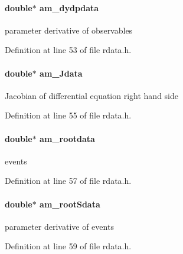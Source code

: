 \paragraph[{am\+\_\+dydpdata}]{\setlength{\rightskip}{0pt plus 5cm}double$\ast$ am\+\_\+dydpdata}\label{struct_return_data_a57a7eb2085d8ed5bb6c62331a2aa3af5}
parameter derivative of observables 

Definition at line 53 of file rdata.\+h.

\hypertarget{struct_return_data_a82d71415ca06c969ebd22a02e4789b1d}{}
\paragraph[{am\+\_\+\+Jdata}]{\setlength{\rightskip}{0pt plus 5cm}double$\ast$ am\+\_\+\+Jdata}\label{struct_return_data_a82d71415ca06c969ebd22a02e4789b1d}
Jacobian of differential equation right hand side 

Definition at line 55 of file rdata.\+h.

\hypertarget{struct_return_data_af1a09a94b46b2a4e6b3e90d37a7fdbe3}{}
\paragraph[{am\+\_\+rootdata}]{\setlength{\rightskip}{0pt plus 5cm}double$\ast$ am\+\_\+rootdata}\label{struct_return_data_af1a09a94b46b2a4e6b3e90d37a7fdbe3}
events 

Definition at line 57 of file rdata.\+h.

\hypertarget{struct_return_data_a98be71879a3ad48c62a203c0a03457f5}{}
\paragraph[{am\+\_\+root\+Sdata}]{\setlength{\rightskip}{0pt plus 5cm}double$\ast$ am\+\_\+root\+Sdata}\label{struct_return_data_a98be71879a3ad48c62a203c0a03457f5}
parameter derivative of events 

Definition at line 59 of file rdata.\+h.

\hypertarget{struct_return_data_a4d7116a416a12564e8058589889357ba}{}
